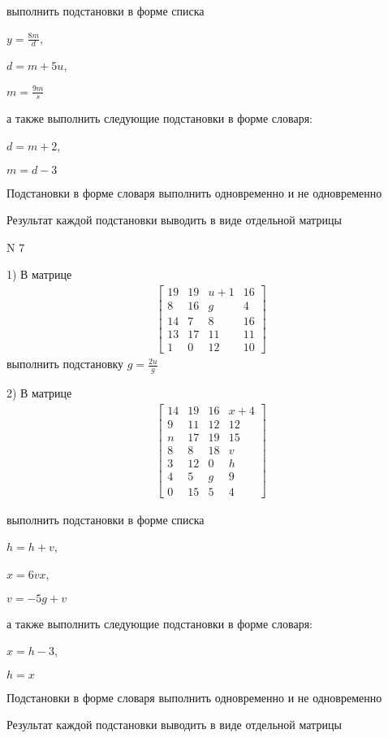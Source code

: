 \documentclass[11pt]{report}
\begin{document}
выполнить подстановки в форме списка

$y=\frac{8 m}{d}$,

$d=m + 5 u$,

$m=\frac{9 m}{s}$

а также выполнить следующие подстановки в форме словаря:

$d=m + 2$,

$m=d - 3$


    Подстановки в форме словаря выполнить одновременно и не одновременно


    Результат каждой подстановки выводить в виде отдельной матрицы

\newpage
N 7


    1) В матрице
\begin{align*}
\left[\begin{matrix}19 & 19 & u + 1 & 16\\8 & 16 & g & 4\\14 & 7 & 8 & 16\\13 & 17 & 11 & 11\\1 & 0 & 12 & 10\end{matrix}\right]
\end{align*}
выполнить подстановку $g=\frac{2 u}{g}$


    2) В матрице
\begin{align*}
\left[\begin{matrix}14 & 19 & 16 & x + 4\\9 & 11 & 12 & 12\\n & 17 & 19 & 15\\8 & 8 & 18 & v\\3 & 12 & 0 & h\\4 & 5 & g & 9\\0 & 15 & 5 & 4\end{matrix}\right]
\end{align*}

выполнить подстановки в форме списка

$h=h + v$,

$x=6 v x$,

$v=- 5 g + v$

а также выполнить следующие подстановки в форме словаря:

$x=h - 3$,

$h=x$


    Подстановки в форме словаря выполнить одновременно и не одновременно


    Результат каждой подстановки выводить в виде отдельной матрицы
\end{document}
